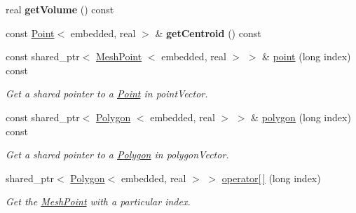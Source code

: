 \begin{DoxyCompactItemize}
\item 
\hypertarget{class_polyhedron_a5fb0dbbf7e0ff2673719623326fb15de}{real {\bfseries get\-Volume} () const }\label{class_polyhedron_a5fb0dbbf7e0ff2673719623326fb15de}

\item 
\hypertarget{class_polyhedron_a216ab5fbf3fd23a9112a3e1d16ec899d}{const \hyperlink{class_point}{\-Point}$<$ embedded, real $>$ \& {\bfseries get\-Centroid} () const }\label{class_polyhedron_a216ab5fbf3fd23a9112a3e1d16ec899d}

\item 
\hypertarget{class_polyhedron_a85926d30dec42f3d8d1c6b5af8a282d3}{const shared\-\_\-ptr$<$ \hyperlink{class_mesh_point}{\-Mesh\-Point}\*
$<$ embedded, real $>$ $>$ \& \hyperlink{class_polyhedron_a85926d30dec42f3d8d1c6b5af8a282d3}{point} (long index) const }\label{class_polyhedron_a85926d30dec42f3d8d1c6b5af8a282d3}

\begin{DoxyCompactList}\small\item\em \-Get a shared pointer to a \hyperlink{class_point}{\-Point} in point\-Vector. \end{DoxyCompactList}\item 
\hypertarget{class_polyhedron_a8aaba4f1c62f24691648ca66419c83fb}{const shared\-\_\-ptr$<$ \hyperlink{class_polygon}{\-Polygon}\*
$<$ embedded, real $>$ $>$ \& \hyperlink{class_polyhedron_a8aaba4f1c62f24691648ca66419c83fb}{polygon} (long index) const }\label{class_polyhedron_a8aaba4f1c62f24691648ca66419c83fb}

\begin{DoxyCompactList}\small\item\em \-Get a shared pointer to a \hyperlink{class_polygon}{\-Polygon} in polygon\-Vector. \end{DoxyCompactList}\item 
\hypertarget{class_polyhedron_a315560a1e132c15d06692a91a6ed69b5}{shared\-\_\-ptr$<$ \hyperlink{class_polygon}{\-Polygon}$<$ embedded, \*
real $>$ $>$ \hyperlink{class_polyhedron_a315560a1e132c15d06692a91a6ed69b5}{operator\mbox{[}$\,$\mbox{]}} (long index)}\label{class_polyhedron_a315560a1e132c15d06692a91a6ed69b5}

\begin{DoxyCompactList}\small\item\em \-Get the \hyperlink{class_mesh_point}{\-Mesh\-Point} with a particular index. \end{DoxyCompactList}\end{DoxyCompactItemize}
